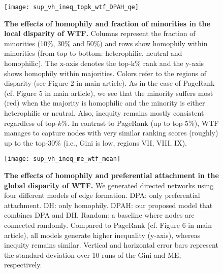 \documentclass[fleqn,10pt]{wlscirep}
\begin{document}
\begin{figure}[h!]
    \centering
    \texttt{[image: sup\_vh\_ineq\_topk\_wtf\_DPAH\_qe]}
    \caption{\textbf{The effects of homophily and fraction of minorities in the local disparity of WTF.} Columns represent the fraction of minorities (10\%, 30\% and 50\%) and rows show homophily within minorities (from top to bottom: heterophilic, neutral and homophilic). 
%
    The x-axis denotes the top-k\% rank and the y-axis shows homophily within majorities. Colors refer to the regions of disparity (see Figure 2 in main article). 
%
    As in the case of PageRank (cf. Figure 5 in main article), we see that the minority suffers most (red) when the majority is homophilic and the minority is either heterophilic or neutral. 
    Also, inequity remains mostly consistent regardless of top-$k$\%. 
%
    In contrast to PageRank (up to top-5\%), WTF manages to capture nodes with very similar ranking scores (roughly) up to the top-30\% (i.e., Gini is low, regions VII, VIII, IX).}
%
    \label{sm:h_wtf}
\end{figure}

\begin{figure}[h!]
    \centering
    \texttt{[image: sup\_vh\_ineq\_me\_wtf\_mean]}
    \caption{\textbf{The effects of homophily and preferential attachment in the global disparity of WTF.} We generated directed networks using four different models of edge formation. DPA: only preferential attachment. DH: only homophily. {DPAH}: our proposed model that combines DPA and DH. Random: a baseline where nodes are connected randomly. 
    Compared to PageRank (cf. Figure 6 in main article), all models generate higher inequality (y-axis), whereas inequity remains similar. 
    Vertical and horizontal error bars represent the standard deviation over 10 runs of the Gini and ME, respectively.}
    \label{sm:vh_wtf}
\end{figure}
\end{document}
